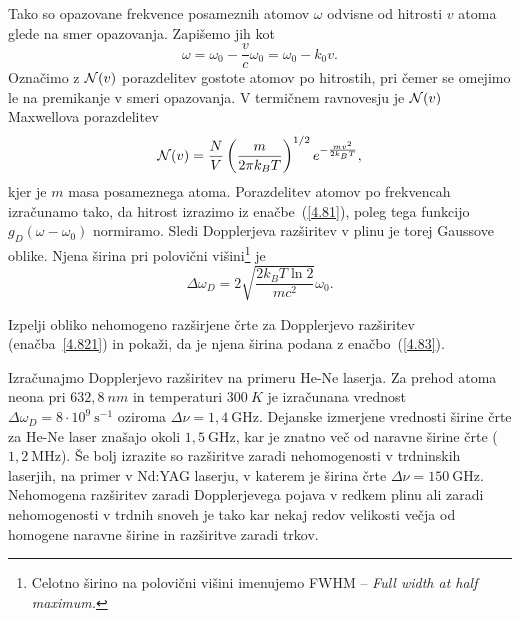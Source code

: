 Tako so opazovane frekvence posameznih atomov $\omega$
odvisne od hitrosti $v$ atoma glede na smer opazovanja. Zapišemo jih kot  
\begin{equation}
\omega=\omega_{0}-\frac{v}{c}\omega_{0}=\omega_{0}-k_{0}v.
\label{4.81}
\end{equation}
Označimo z ${\cal N}(v)$ porazdelitev gostote atomov po hitrostih, pri čemer se omejimo 
le na premikanje v smeri opazovanja. V termičnem ravnovesju je ${\cal N}(v)$
Maxwellova porazdelitev
\begin{equation}
{\cal N}(v)=\frac{N}{V}\left(\frac{m}{2\pi k_{B}T}\right)^{1/2}e^{-\frac{mv^{2}}{2k_{B}T}},
\label{4.82}
\end{equation}
kjer je $m$ masa posameznega atoma.
Porazdelitev atomov po frekvencah izračunamo tako, da hitrost izrazimo
iz enačbe~(\ref{4.81}), poleg tega funkcijo $g_{D}(\omega-\omega_0)$
normiramo. Sledi
Dopplerjeva razširitev v plinu je torej Gaussove oblike.
Njena širina pri polovični 
višini\footnote{Celotno širino na polovični višini imenujemo FWHM -- \it{Full width at half maximum}.} je
\begin{equation} 
\Delta\omega_{D}=2 \sqrt{\frac{2k_{B}T \ln 2}{mc^{2}}}\omega_{0}.
\label{4.83}
\end{equation}
\begin{definition}
Izpelji obliko nehomogeno razširjene črte za Dopplerjevo razširitev (enačba~\ref{4.821})
in pokaži, da je njena širina podana z enačbo~(\ref{4.83}).
\end{definition}

Izračunajmo Dopplerjevo razširitev na primeru He-Ne laserja. Za prehod
atoma neona pri $632,8~\si{nm}$ in temperaturi $300~\si{K}$ je izračunana vrednost
$\Delta\omega_{D}=8\cdot10^{9}~\si{\second}^{-1}$ oziroma $\Delta \nu = 1,4~\si{\giga\hertz}$. 
Dejanske izmerjene vrednosti širine črte za He-Ne laser 
znašajo okoli $1,5~\si{\giga\hertz}$, kar je znatno več od naravne širine
črte ($1,2~\si{\mega\hertz}$). Še bolj izrazite so razširitve zaradi nehomogenosti
v trdninskih laserjih, na primer v Nd:YAG laserju, v katerem 
je širina črte $\Delta \nu= 150~\si{\giga\hertz}$. Nehomogena razširitev zaradi Dopplerjevega pojava v 
redkem plinu ali zaradi nehomogenosti v trdnih snoveh je tako kar nekaj redov velikosti 
večja od homogene naravne širine in razširitve zaradi trkov.

